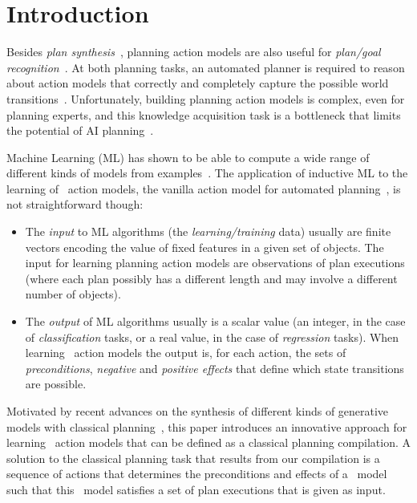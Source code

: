 
\section{Introduction}
\label{sec:Section1}

Besides {\em plan synthesis}~\cite{ghallab2004automated}, planning action models are also useful for {\em plan/goal recognition}~\cite{ramirez2012plan}. At both planning tasks, an automated planner is required to reason about action models that correctly and completely capture the possible world transitions~\cite{geffner:book:2013}. Unfortunately, building planning action models is complex, even for planning experts, and this knowledge acquisition task is a bottleneck that limits the potential of AI planning~\cite{kambhampati:modellite:AAAI2007}.

Machine Learning (ML) has shown to be able to compute a wide range of different kinds of models from examples~\cite{michalski2013machine}. The application of inductive ML to the learning of \strips\ action models, the vanilla action model for automated planning~\cite{fikes1971strips}, is not straightforward though:
\begin{itemize}
\item The {\em input} to ML algorithms (the {\em learning/training} data) usually are finite vectors encoding the value of fixed features in a given set of objects. The input for learning planning action models are observations of plan executions (where each plan possibly has a different length and may involve a different number of objects).
\item The {\em output} of ML algorithms usually is a scalar value (an integer, in the case of {\em classification} tasks, or a real value, in the case of {\em regression} tasks). When learning \strips\ action models the output is, for each action, the sets of {\em preconditions}, {\em negative} and {\em positive effects} that define which state transitions are possible.
\end{itemize}

Motivated by recent advances on the synthesis of different kinds of generative models with classical planning~\cite{bonet2009automatic,segovia2016generalized,segovia2016hierarchical,segovia2017generating}, this paper introduces an innovative approach for learning \strips\ action models that can be defined as a classical planning compilation. A solution to the classical planning task that results from our compilation is a sequence of actions that determines the preconditions and effects of a \strips\ model such that this \strips\ model satisfies a set of plan executions that is given as input.

